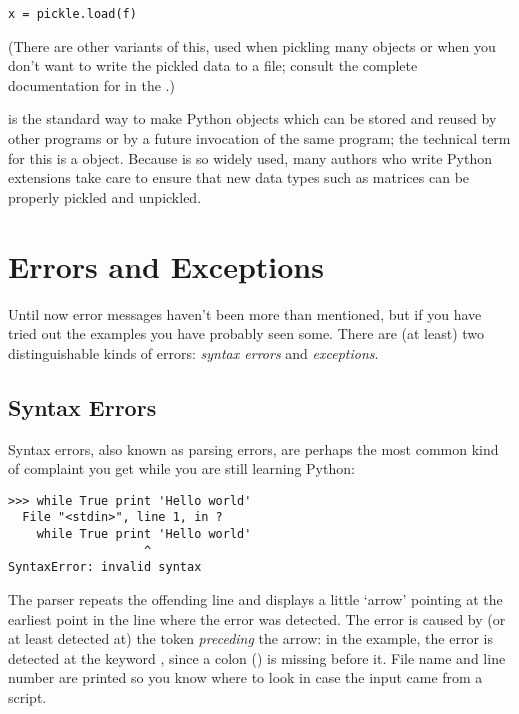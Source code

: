 \documentclass{manual}
\begin{document}
\begin{verbatim}
x = pickle.load(f)
\end{verbatim}

(There are other variants of this, used when pickling many objects or
when you don't want to write the pickled data to a file; consult the
complete documentation for
 in the
.)

 is the standard way
to make Python objects which can be stored and reused by other
programs or by a future invocation of the same program; the technical
term for this is a  object.  Because
 is so widely used,
many authors who write Python extensions take care to ensure that new
data types such as matrices can be properly pickled and unpickled.



\chapter{Errors and Exceptions \label{errors}}

Until now error messages haven't been more than mentioned, but if you
have tried out the examples you have probably seen some.  There are
(at least) two distinguishable kinds of errors:
\emph{syntax errors} and \emph{exceptions}.

\section{Syntax Errors \label{syntaxErrors}}

Syntax errors, also known as parsing errors, are perhaps the most common
kind of complaint you get while you are still learning Python:

\begin{verbatim}
>>> while True print 'Hello world'
  File "<stdin>", line 1, in ?
    while True print 'Hello world'
                   ^
SyntaxError: invalid syntax
\end{verbatim}

The parser repeats the offending line and displays a little `arrow'
pointing at the earliest point in the line where the error was
detected.  The error is caused by (or at least detected at) the token
\emph{preceding} the arrow: in the example, the error is detected at
the keyword , since a colon (\character{:}) is missing
before it.  File name and line number are printed so you know where to
look in case the input came from a script.
\end{document}
